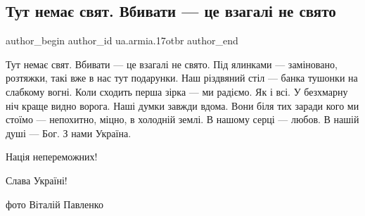  
 
 
 
 

\subsection{Тут немає свят. Вбивати — це взагалі не свято}
\label{sec:06_01_2023.fb.ua.armia.17otbr.1.tut_nema__svyat__vbi}

\ifcmt
 author_begin
   author_id ua.armia.17otbr
 author_end
\fi

Тут немає свят. Вбивати — це взагалі не свято. Під ялинками — заміновано,
розтяжки, такі вже в нас тут подарунки. Наш різдвяний стіл — банка тушонки на
слабкому вогні. Коли сходить перша зірка — ми радіємо. Як і всі. У безхмарну
ніч краще видно ворога. Наші думки завжди вдома. Вони біля тих заради кого ми
стоїмо — непохитно, міцно, в холодній землі. В нашому серці — любов. В нашій
душі — Бог. З нами Україна.

Нація непереможних!

Слава Україні!

фото Віталій Павленко
